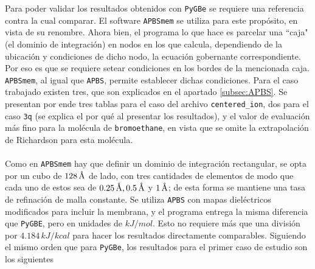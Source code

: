 \documentclass[12pt, oneside, numbers, spanish]{ezthesis}
\numberwithin{equation}{section}
\newcommand{\angstrom}{\text{\normalfont\AA}}
\begin{document}
Para poder validar los resultados obtenidos con \texttt{PyGBe} se requiere una referencia contra la cual comparar. El software \texttt{APBSmem} se utiliza para este propósito, en vista de su renombre. Ahora bien, el programa lo que hace es parcelar una ``caja" (el dominio de integración) en nodos en los que calcula, dependiendo de la ubicación y condiciones de dicho nodo, la ecuación gobernante correspondiente. Por eso es que se requiere setear condiciones en los bordes de la mencionada caja. \texttt{APBSmem}, al igual que \texttt{APBS}, permite establecer dichas condiciones. Para el caso trabajado existen tres, que son explicados en el apartado \ref{subsec:APBS}. Se presentan por ende tres tablas para el caso del archivo \texttt{centered\_ion}, dos para el caso \texttt{3q} (se explica el por qué al presentar los resultados), y el valor de evaluación más fino para la molécula de \texttt{bromoethane}, en vista que se omite la extrapolación de Richardson para esta molécula.\\\\
Como en \texttt{APBSmem} hay que definir un dominio de integración rectangular, se opta por un cubo de $128\,\angstrom$ de lado, con tres cantidades de elementos de modo que cada uno de estos sea de $0.25\,\angstrom, 0.5\,\angstrom$ y $1\,\angstrom$; de esta forma se mantiene una tasa de refinación de malla constante. Se utiliza \texttt{APBS} con mapas dieléctricos modificados para incluir la membrana, y el programa entrega la misma diferencia que \texttt{PyGBE}, pero en unidades de $kJ/mol$. Esto no requiere más que una división por $4.184\, kJ/kcal$ para hacer los resultados directamente comparables. Siguiendo el mismo orden que para \texttt{PyGBe}, los resultados para el primer caso de estudio son los siguientes
\end{document}
